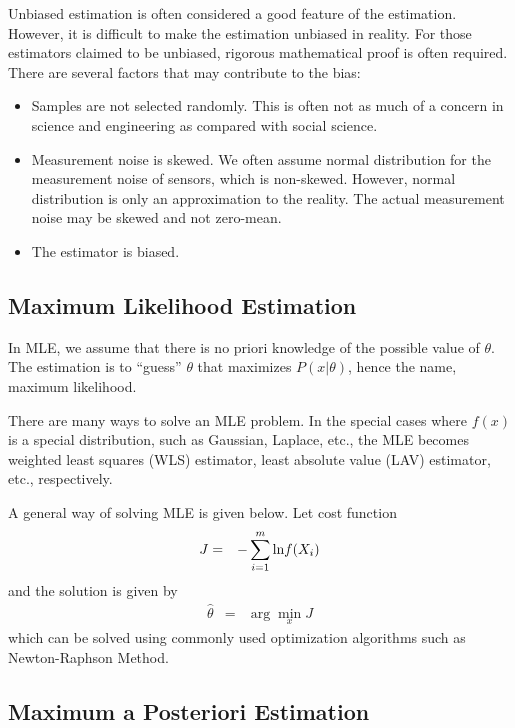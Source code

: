 Unbiased estimation is often considered a good feature of the estimation. However, it is difficult to make the estimation unbiased in reality. For those estimators claimed to be unbiased, rigorous mathematical proof is often required. There are several factors that may contribute to the bias:
\begin{itemize}
	\item Samples are not selected randomly. This is often not as much of a concern in science and engineering as compared with social science.
	\item Measurement noise is skewed. We often assume normal distribution for the measurement noise of sensors, which is non-skewed. However, normal distribution is only an approximation to the reality. The actual measurement noise may be skewed and not zero-mean.
	\item The estimator is biased.
\end{itemize}

\subsection{Maximum Likelihood Estimation}

In MLE, we assume that there is no priori knowledge of the possible value of $\theta$. The estimation is to ``guess'' $\theta$ that maximizes $P(x|\theta)$, hence the name, maximum likelihood.

There are many ways to solve an MLE problem. In the special cases where $f(x)$ is a special distribution, such as Gaussian, Laplace, etc., the MLE becomes weighted least squares (WLS) estimator, least absolute value (LAV) estimator, etc., respectively.

A general way of solving MLE is given below. Let cost function
\begin{eqnarray}
	J &=& -\sum_{i=1}^{m}\textup{ln}f(X_i) \label{eq:mlecostfunc}
\end{eqnarray}
and the solution is given by
\begin{eqnarray}
	\hat{\theta} &=& \arg\min_{x} J \nonumber
\end{eqnarray}
which can be solved using commonly used optimization algorithms such as Newton-Raphson Method.

\subsection{Maximum a Posteriori Estimation}

